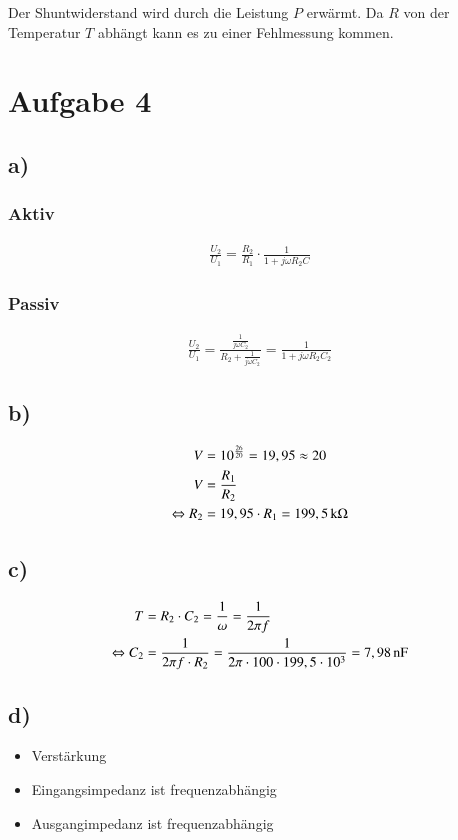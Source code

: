 Der Shuntwiderstand wird durch die Leistung $P$ erwärmt. Da $R$ von der Temperatur $T$ abhängt kann es zu einer Fehlmessung kommen.


\section{Aufgabe 4}

\subsection*{a)}

\subsubsection*{Aktiv}

\begin{align*}
\frac{U_2}{U_1} = \frac{R_2}{R_1} \cdot \frac{1}{1 + j \omega R_2 C}
\end{align*}


\subsubsection*{Passiv}

\begin{align*}
\frac{U_2}{U_1} = \frac{\frac{1}{j \omega C_2}}{R_2 + \frac{1}{j \omega C_2}} = \frac{1}{1 + j \omega R_2 C_2}
\end{align*}


\subsection*{b)}

\begin{align*}
V &= 10^{\frac{26}{20}} = 19,95 \approx 20 \\
V &= \frac{R_1}{R_2} \\
\Leftrightarrow R_2 &= 19,95 \cdot R_1 = \unit[199,5]{k \Omega}
\end{align*}


\subsection*{c)}

\begin{align*}
T &= R_2 \cdot C_2 = \frac{1}{\omega} = \frac{1}{2 \pi f} \\
\Leftrightarrow C_2 &= \frac{1}{2 \pi f \cdot R_2} = \frac{1}{2 \pi \cdot 100 \cdot 199,5 \cdot 10^3} = \unit[7,98]{nF}
\end{align*}


\subsection*{d)}

\begin{itemize}
	\item Verstärkung
	\item Eingangsimpedanz ist frequenzabhängig
	\item Ausgangimpedanz ist frequenzabhängig
\end{itemize}



















